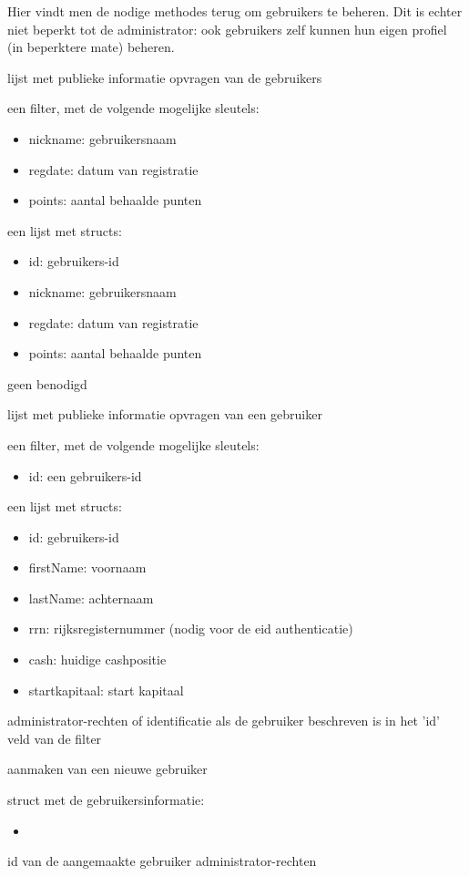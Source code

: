 Hier vindt men de nodige methodes terug om gebruikers te beheren. Dit is echter niet beperkt tot de administrator: ook gebruikers zelf kunnen hun eigen profiel (in beperktere mate) beheren.

	{ lijst met publieke informatie opvragen van de gebruikers }
	{ een filter, met de volgende mogelijke sleutels:
		\begin{itemize}
		\item{nickname: gebruikersnaam}
		\item{regdate: datum van registratie}
		\item{points: aantal behaalde punten}
		\end{itemize} }
	{ een lijst met structs:
		\begin{itemize}
		\item{id: gebruikers-id}
		\item{nickname: gebruikersnaam}
		\item{regdate: datum van registratie}
		\item{points: aantal behaalde punten}
		\end{itemize} }
	{ geen benodigd }

	{ lijst met publieke informatie opvragen van een gebruiker }
	{ een filter, met de volgende mogelijke sleutels:
		\begin{itemize}
		\item{id: een gebruikers-id}
		\end{itemize} }
	{ een lijst met structs:
		\begin{itemize}
		\item{id: gebruikers-id}
		\item{firstName: voornaam}
		\item{lastName: achternaam}
		\item{rrn: rijksregisternummer (nodig voor de eid authenticatie)}
		\item{cash: huidige cashpositie}
		\item{startkapitaal: start kapitaal}
		\end{itemize} }
	{ administrator-rechten of identificatie als de gebruiker beschreven is in het 'id' veld van de filter }

	{ aanmaken van een nieuwe gebruiker }
	{ struct met de gebruikersinformatie:
		\begin{itemize}
		\item{}
		\end{itemize} }
	{ id van de aangemaakte gebruiker }
	{ administrator-rechten }

